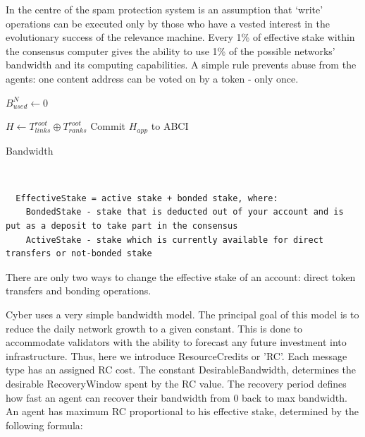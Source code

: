 \documentclass[8pt,oneside]{amsart}
\newcommand{\code}[1]{{\PlayBold #1}}
\begin{document}
In the centre of the spam protection system is an assumption that ‘write’ operations can be executed only by those who have a vested interest in the evolutionary success of the relevance machine. Every 1\% of effective stake within the consensus computer gives the ability to use 1\% of the possible networks' bandwidth and its computing capabilities. A simple rule prevents abuse from the agents: one content address can be voted on by a token - only once.

\begin{algorithm}
$B^{N}_{used} \leftarrow 0$\;

\BlankLine
$H \leftarrow T^{root}_{links} \oplus T^{root}_{ranks}$\;
Commit $H_{app}$ to ABCI\;
\caption{Bandwidth}\label{algo_protocol}
\end{algorithm}\

\begin{lstlisting}
  EffectiveStake = active stake + bonded stake, where:
    BondedStake - stake that is deducted out of your account and is put as a deposit to take part in the consensus
    ActiveStake - stake which is currently available for direct transfers or not-bonded stake
\end{lstlisting}

There are only two ways to change the effective stake of an account: direct token transfers and bonding operations.

Cyber uses a very simple bandwidth model. The principal goal of this model is to reduce the daily network growth to a given constant. This is done to accommodate validators with the ability to forecast any future investment into infrastructure. Thus, here we introduce \code{ResourceCredits} or 'RC'. Each message type has an assigned RC cost. The constant \code{DesirableBandwidth}, determines the desirable \code{RecoveryWindow} spent by the RC value. The recovery period defines how fast an agent can recover their bandwidth from 0 back to max bandwidth. An agent has maximum RC  proportional to his effective stake, determined by the following formula:
\end{document}
